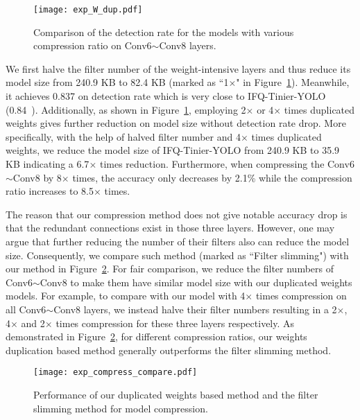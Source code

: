 \documentclass[10pt,twocolumn,letterpaper]{article}
\begin{document}
\begin{figure}[!htb]
	\begin{center}
		\texttt{[image: exp\_W\_dup.pdf]}
	\end{center}
	\caption{Comparison of the detection rate for the models with various compression ratio on Conv6$\sim$Conv8 layers.}
	\label{fig:exp_W_dup}
\end{figure}

We first halve the filter number of the weight-intensive layers and thus reduce its model size from 240.9 KB to 82.4 KB (marked as ``1$\times$" in Figure~\ref{fig:exp_W_dup}). Meanwhile, it achieves 0.837 on detection rate which is very close to IFQ-Tinier-YOLO (0.84~\cite{IFQNet}). Additionally, as shown in Figure~\ref{fig:exp_W_dup}, employing 2$\times$ or 4$\times$ times duplicated weights gives further reduction on model size without detection rate drop. More specifically, with the help of halved filter number and 4$\times$ times duplicated weights, we reduce the model size of IFQ-Tinier-YOLO from 240.9 KB to 35.9 KB indicating a 6.7$\times$ times reduction. Furthermore,  when compressing the Conv6$\sim$Conv8 by 8$\times$ times, the accuracy only decreases by 2.1\% while the compression ratio increases to 8.5$\times$ times. 

The reason that our compression method does not give notable accuracy drop is that the redundant connections exist in those three layers. However, one may argue that further reducing the number of their filters also can reduce the model size. Consequently, we compare such method (marked as ``Filter slimming") with our method in Figure~\ref{fig:exp_compress_compare}. For fair comparison, we reduce the filter numbers of Conv6$\sim$Conv8 to make them have similar model size with our duplicated weights models. For example, to compare with our model with 4$\times$ times compression on all Conv6$\sim$Conv8 layers, we instead halve their filter numbers resulting in a 2$\times$, 4$\times$ and 2$\times$ times compression for these three layers respectively. As demonstrated in Figure~\ref{fig:exp_compress_compare}, for different compression ratios, our weights duplication based method generally outperforms the filter slimming method. 

\begin{figure}[!htb]
	\begin{center}
		\texttt{[image: exp\_compress\_compare.pdf]}
	\end{center}
	\caption{Performance of our duplicated weights based method and the filter slimming method for model compression.}
	\label{fig:exp_compress_compare}
\end{figure}
\end{document}
